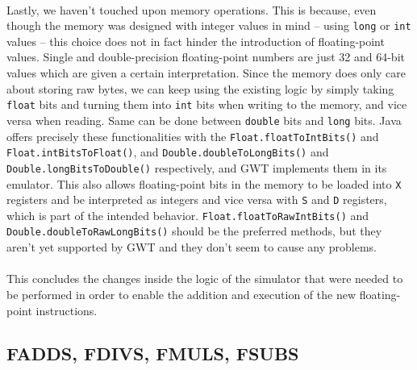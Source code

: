 \paragraph{}
Lastly, we haven't touched upon memory operations. This is because, even though the memory was designed with integer values in mind -- using \verb|long| or \verb|int| values -- this choice does not in fact hinder the introduction of floating-point values. Single and double-precision floating-point numbers are just 32 and 64-bit values which are given a certain interpretation. Since the memory does only care about storing raw bytes, we can keep using the existing logic by simply taking \verb|float| bits and turning them into \verb|int| bits when writing to the memory, and vice versa when reading. Same can be done between \verb|double| bits and \verb|long| bits. Java offers precisely these functionalities with the \verb|Float.floatToIntBits()| and \verb|Float.intBitsToFloat()|, and \verb|Double.doubleToLongBits()| and \verb|Double.longBitsToDouble()| respectively, and GWT implements them in its emulator. This also allows floating-point bits in the memory to be loaded into \verb|X| registers and be interpreted as integers and vice versa with \verb|S| and \verb|D| registers, which is part of the intended behavior. \verb|Float.floatToRawIntBits()| and \verb|Double.doubleToRawLongBits()| should be the preferred methods, but they aren't yet supported by GWT and they don't seem to cause any problems.
\paragraph{}
This concludes the changes inside the logic of the simulator that were needed to be performed in order to enable the addition and execution of the new floating-point instructions.
\subsection{FADDS, FDIVS, FMULS, FSUBS}

